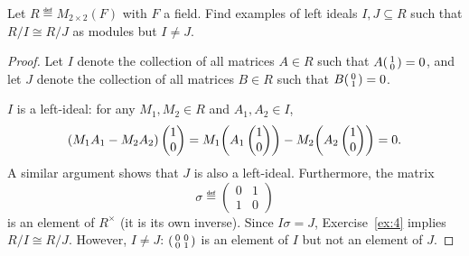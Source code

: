 \documentclass{./typewriter-math}
\begin{document}
	\begin{exercise}
		Let \(R \eqdef M_{2\times 2}(F)\) with \(F\) a field. Find examples of
		left ideals \(I,J \subseteq R\) such that \(R/I \cong R/J\) as modules but
		\(I \neq J\).

		\begin{proof}
			Let \(I\) denote the collection of all matrices \(A \in R\) such that \(A
			{\left(\begin{smallmatrix} 1 \\ 0 \end{smallmatrix}\right)} = 0\), and let \(J\)
			denote the collection of all matrices \(B \in R\) such that
			\(B{\left(\begin{smallmatrix} 0 \\ 1 \end{smallmatrix}\right)} = 0\).

			\(I\) is a left-ideal: for any \(M_1, M_2 \in R\) and \(A_1,
			A_2 \in I\),%
			\[%
				\pwrap{M_1 A_1 - M_2 A_2}\begin{pmatrix} 1 \\ 0 \end{pmatrix} = M_1
				\pwrap{ A_1 \begin{pmatrix}1\\0\end{pmatrix} } - M_2 \pwrap{ A_2
				\begin{pmatrix}1\\0\end{pmatrix} } = 0.
			\]%
			A similar argument shows that \(J\) is also a left-ideal. Furthermore,
			the matrix%
			\[%
				\sigma \eqdef \begin{pmatrix}
					0 & 1 \\
					1 & 0
				\end{pmatrix}
			\]%
			is an element of \(R^\times\) (it is its own inverse). Since \(I \sigma =
			J\), Exercise~\ref{ex:4} implies \(R/I \cong R/J\). However, \(I \neq
			J\): \({\left(\begin{smallmatrix} 0 & 0 \\ 0 & 1 \end{smallmatrix}\right)}\) is
			an element of \(I\) but not an element of \(J\).
		\end{proof}
	\end{exercise}
\end{document}
